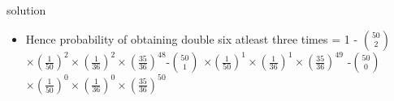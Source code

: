 \documentclass{beamer}
\begin{document}
    \begin{frame}{solution}
    \begin{itemize}
        \item 
        Hence probability of obtaining double six atleast three times = 1 - ${50}\choose{2}$ $\times(\frac{1}{50})^2\times(\frac{1}{36})^2\times(\frac{35}{36})^{48}$-${50}\choose{1}$ $\times(\frac{1}{50})^1\times(\frac{1}{36})^1\times(\frac{35}{36})^{49}$ -${50}\choose{0}$ $\times(\frac{1}{50})^0\times(\frac{1}{36})^0\times(\frac{35}{36})^{50}$
   
    \end{itemize}
    \end{frame}

   
\end{document}

